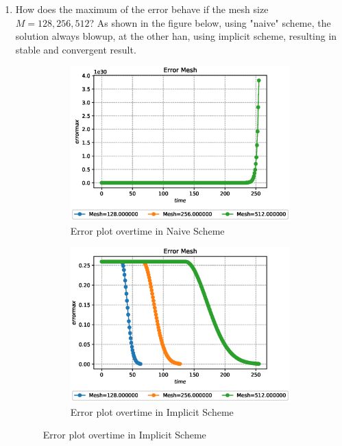 \documentclass[a4paper,12pt]{article}
\begin{document}
\begin{enumerate}
\item How does the maximum of the error behave if the mesh size $M=128,256,512$?
As shown in the figure below, using "naive" scheme, the solution always blowup, at the other han, using implicit scheme, resulting in stable and convergent result.
\begin{figure}[h!]
	\begin{subfigure}{0.49\linewidth}
		\centering
		\includegraphics[width=\linewidth]{baapict/errmesh}
		\caption{Error plot overtime in Naive Scheme}
	\end{subfigure}
	\begin{subfigure}{0.49\linewidth}
		\centering
		\includegraphics[width=\linewidth]{baapict/errmeshimplicit}
		\caption{Error plot overtime in Implicit Scheme}
	\end{subfigure}
\end{figure}
\end{enumerate}
\end{document}
